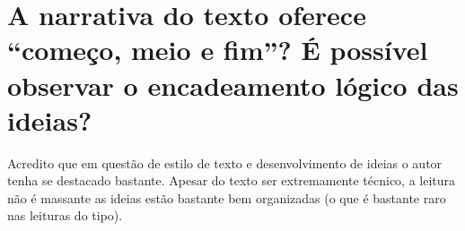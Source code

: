 \documentclass[11pt]{article}
\begin{document}
\section{A narrativa do texto oferece ``começo, meio e fim''? É possível
  observar o encadeamento lógico das ideias?}
Acredito que em questão de estilo de texto e desenvolvimento de ideias o autor
tenha se destacado bastante. Apesar do texto ser extremamente técnico, a leitura
não é massante as ideias estão bastante bem organizadas (o que é bastante raro
nas leituras do tipo).
\end{document}
